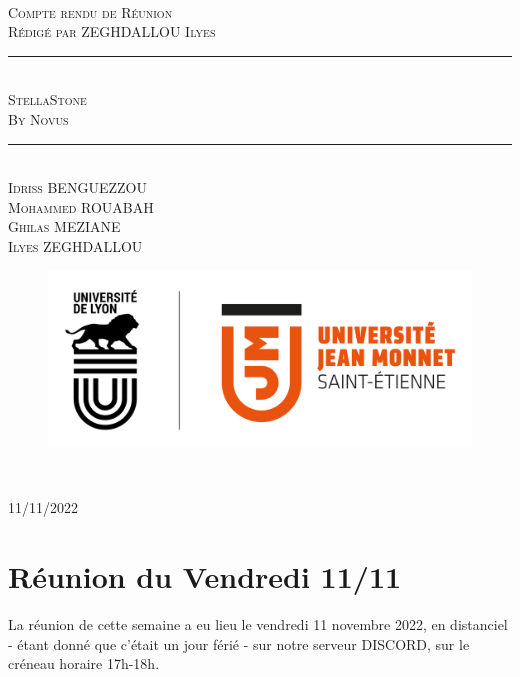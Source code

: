 \documentclass[a4paper, 12pt]{article}
\newcommand{\HRule}{\rule{\linewidth}{0.5mm}}
\begin{document}
\begin{titlepage}
  \begin{sffamily}
  \begin{center}

   
    \textsc{\LARGE }\\[2cm]

    \textsc{\Large Compte rendu de Réunion}\\[1.5cm]
    \textsc{\Medium Rédigé par ZEGHDALLOU Ilyes}

    \HRule \\[0.4cm]
    { \huge  \textsc{StellaStone} \\
    \textsc{\Large By Novus}\\ [0.4cm] }
	

    \HRule \\[2cm]
    \textsc {Idriss BENGUEZZOU\\Mohammed ROUABAH\\Ghilas MEZIANE \\ Ilyes ZEGHDALLOU}
 \begin{figure}
     \centering
    \includegraphics[scale=0.2]{logoUJM.png}
     \label{fig:ujm_logo}
 \end{figure}
   
    \

    \vfill

    {\large {} 11/11/2022}

  \end{center}
  \end{sffamily}
\end{titlepage}

\newpage

\section{Réunion du Vendredi 11/11}
La réunion de cette semaine a eu lieu le vendredi 11 novembre 2022, en distanciel - étant donné que c'était un jour férié - sur notre serveur DISCORD, sur le créneau horaire 17h-18h.
\end{document}
